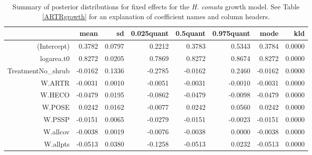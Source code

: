 \documentclass[11pt]{article}
\begin{document}
\begin{table}[ht]
\centering
\caption{Summary of posterior distributions for fixed effects for the \textit{H. comata} growth model. See Table \ref{ARTRgrowth} for an explanation of coefficient names
and column headers.} 
\label{HECOgrowth}
\begin{tabular}{rrrrrrrr}
  \hline
 & mean & sd & 0.025quant & 0.5quant & 0.975quant & mode & kld \\ 
  \hline
(Intercept) & 0.3782 & 0.0797 & 0.2212 & 0.3783 & 0.5343 & 0.3784 & 0.0000 \\ 
  logarea.t0 & 0.8272 & 0.0205 & 0.7869 & 0.8272 & 0.8674 & 0.8272 & 0.0000 \\ 
  TreatmentNo\_shrub & -0.0162 & 0.1336 & -0.2785 & -0.0162 & 0.2460 & -0.0162 & 0.0000 \\ 
  W.ARTR & -0.0031 & 0.0010 & -0.0051 & -0.0031 & -0.0010 & -0.0031 & 0.0000 \\ 
  W.HECO & -0.0479 & 0.0195 & -0.0862 & -0.0479 & -0.0098 & -0.0479 & 0.0000 \\ 
  W.POSE & 0.0242 & 0.0162 & -0.0077 & 0.0242 & 0.0560 & 0.0242 & 0.0000 \\ 
  W.PSSP & -0.0151 & 0.0065 & -0.0279 & -0.0151 & -0.0023 & -0.0151 & 0.0000 \\ 
  W.allcov & -0.0038 & 0.0019 & -0.0076 & -0.0038 & 0.0000 & -0.0038 & 0.0000 \\ 
  W.allpts & -0.0513 & 0.0380 & -0.1258 & -0.0513 & 0.0232 & -0.0513 & 0.0000 \\ 
   \hline
\end{tabular}
\end{table}
\end{document}
